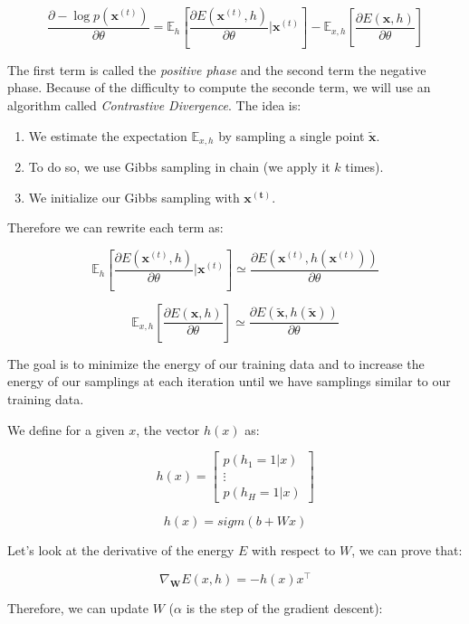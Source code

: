 \documentclass{article}
\begin{document}
\[ \frac{\partial - \log p(\mathbf{x}^{(t)})}{\partial \theta} = \mathbb{E}_h \left[ \frac{\partial E(\mathbf{x}^{(t)} ,h)}{\partial \theta} | \mathbf{x}^{(t)} \right] - \mathbb{E}_{x,h} \left[ \frac{\partial E(\mathbf{x} ,h)}{\partial \theta} \right] \]

The first term is called the \emph{positive phase} and the second term the {negative phase}. Because of the difficulty to compute the seconde term, we will use an algorithm called \emph{Contrastive Divergence}. The idea is:

\begin{enumerate}
    \item We estimate the expectation $\mathbb{E}_{x,h}$ by sampling a single point $\mathbf{\tilde x}$.
    \item To do so, we use Gibbs sampling in chain (we apply it $k$ times).
    \item We initialize our Gibbs sampling with $\mathbf{x^{(t)}}$.
\end{enumerate}

Therefore we can rewrite each term as:

\[ \mathbb{E}_h \left[ \frac{\partial E(\mathbf{x}^{(t)} ,h)}{\partial \theta} | \mathbf{x}^{(t)} \right] \simeq \frac{\partial E(\mathbf{x}^{(t)} ,h(\mathbf{x}^{(t)}))}{\partial \theta} \]

\[ \mathbb{E}_{x,h} \left[ \frac{\partial E(\mathbf{x} ,h)}{\partial \theta} \right] \simeq \frac{\partial E(\mathbf{\tilde x} ,h(\mathbf{\tilde x}))}{\partial \theta} \]

The goal is to minimize the energy of our training data and to increase the energy of our samplings at each iteration until we have samplings similar to our training data.

We define for a given $x$, the vector $h(x)$ as:

\[ h(x) =
\begin{bmatrix}
    p(h_1 = 1 | x)  \\
    \vdots \\
    p(h_H = 1 | x)
\end{bmatrix}
\]

$$ h(x) = sigm(b + Wx) $$

Let's look at the derivative of the energy $E$ with respect to $W$, we can prove that:

\[ \nabla_{\mathbf{W}} E(x,h) = -h(x) x^\top \]

Therefore, we can update $W$ ($\alpha$ is the step of the gradient descent):
\end{document}
